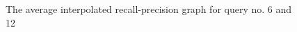 \documentclass[letterpaper,11pt]{article}
\begin{document}
\begin{figure}[H]
	\centering
	\caption{The average interpolated recall-precision graph for query no. 6 and 12}
	\label{fig:84_avg-interpolated}
\end{figure}
\end{document}
